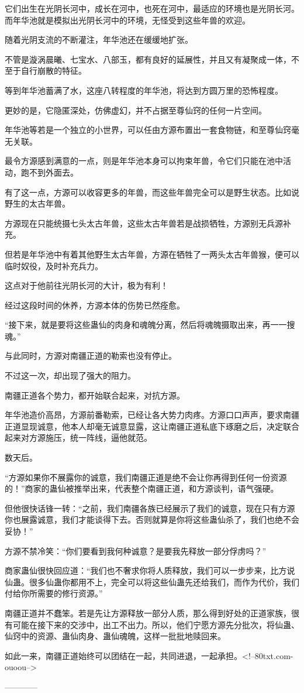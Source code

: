 \begin{this_body}
它们出生在光阴长河中，成长在河中，也死在河中，最适应的环境也是光阴长河。而年华池就是模拟出光阴长河中的环境，无怪受到这些年兽的欢迎。

随着光阴支流的不断灌注，年华池还在缓缓地扩张。

不管是漩涡晨曦、七宝水、八部玉，都有良好的延展性，并且又有凝聚成一体，不至于自行崩散的特征。

等到年华池蓄满了水，这座八转程度的年华池，将达到方圆万里的恐怖程度。

更妙的是，它隐匿深处，仿佛虚幻，并不占据至尊仙窍的任何一片空间。

年华池等若是一个独立的小世界，可以任由方源布置出一套食物链，和至尊仙窍毫无关联。

最令方源感到满意的一点，则是年华池本身可以拘束年兽，令它们只能在池中活动，跑不到外面去。

有了这一点，方源可以收容更多的年兽，而这些年兽完全可以是野生状态。比如说野生的太古年兽。

方源现在只能统摄七头太古年兽，这些太古年兽若是战损牺牲，方源别无兵源补充。

但若是年华池中有着其他野生太古年兽，方源在牺牲了一两头太古年兽猴，便可以临时奴役，及时补充兵力。

这点对于他前往光阴长河的大计，极为有利！

经过这段时间的休养，方源本体的伤势已然痊愈。

“接下来，就是要将这些蛊仙的肉身和魂魄分离，然后将魂魄摄取出来，再一一搜魂。”

与此同时，方源对南疆正道的勒索也没有停止。

不过这一次，却出现了强大的阻力。

南疆正道各个势力，都开始联合起来，对抗方源。

年华池造价高昂，方源前番勒索，已经让各大势力肉疼。方源口口声声，要求南疆正道显现诚意，他本人却毫无诚意显露，这让南疆正道私底下琢磨之后，决定联合起来对方源施压，统一阵线，逼他就范。

数天后。

“方源如果你不展露你的诚意，我们南疆正道是绝不会让你再得到任何一份资源的！”商家的蛊仙被推举出来，代表整个南疆正道，和方源谈判，语气强硬。

但他很快话锋一转：“之前，我们南疆各族已经展示了我们的诚意，现在只有方源你也展露诚意，我们才能谈得下去。否则就算是你将这些蛊仙杀了，我们也绝不会妥协！”

方源不禁冷笑：“你们要看到我何种诚意？是要我先释放一部分俘虏吗？”

商家蛊仙很快回应道：“我们也不奢求你将人质释放，我们可以一步步来，比方说仙蛊。很多仙蛊你都用不上，完全可以将这些仙蛊先还给我们，而作为代价，我们付给你所需要的修行资源。”

南疆正道并不蠢笨。若是先让方源释放一部分人质，那么得到好处的正道家族，很有可能在接下来的交涉中，出工不出力。所以，他们宁愿方源先分批次，将仙蛊、仙窍中的资源、蛊仙肉身、蛊仙魂魄，这样一批批地赎回来。

如此一来，南疆正道始终可以团结在一起，共同进退，一起承担。<!--80txt.com-ouoou-->

------------

\end{this_body}

